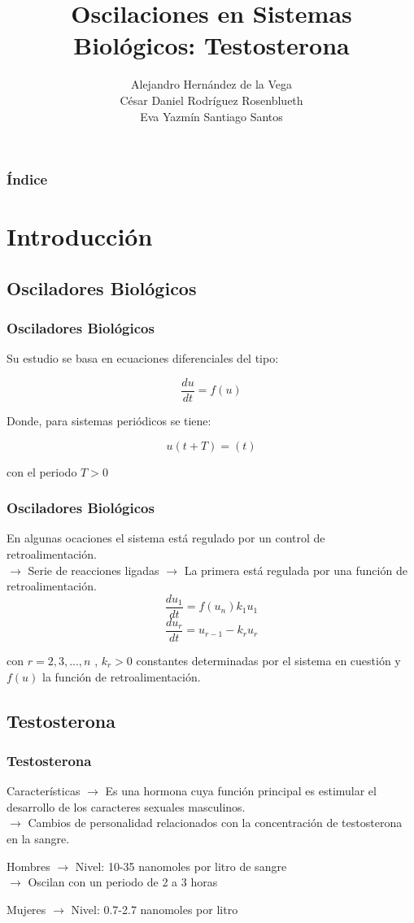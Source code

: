 \documentclass[10pt]{beamer}
\title[Oscilaciones en Sistemas Biológicos: Testosterona]{Oscilaciones en Sistemas Biológicos: Testosterona}
\author{Alejandro Hernández de la Vega\\ César Daniel Rodríguez Rosenblueth \\ Eva Yazmín Santiago Santos}
\institute{Facultad de Ciencias. UNAM}
\date{}
\begin{document}
\begin{frame}
\titlepage
\end{frame}

\begin{frame}
\frametitle{Índice}
\tableofcontents
\end{frame}

\section{Introducción}

\subsection{Osciladores Biológicos}

\begin{frame}
\frametitle{Osciladores Biológicos}
Su estudio se basa en ecuaciones diferenciales del tipo:

$$\dfrac{du}{dt} = f(u)$$

Donde, para sistemas periódicos se tiene:

$$u(t+T)= (t) $$

con el periodo $T>0$
\end{frame}

\begin{frame}
\frametitle{Osciladores Biológicos}
En algunas ocaciones el sistema está regulado por un control de retroalimentación. \\
$\rightarrow$  Serie de reacciones ligadas
$\rightarrow$ La primera está regulada por una función de retroalimentación.\\

$$ \dfrac{d u_1}{dt} = f(u_n )k_1 u_1 $$ 
$$ \dfrac{d u_r}{dt}= u_{r-1} -k_r u_r $$

con $r=2,3,...,n$ , $ k_r > 0 $ constantes determinadas por el sistema en cuestión y $ f(u)$ la función de retroalimentación.
\end{frame}


\subsection{Testosterona}
\begin{frame}
\frametitle{Testosterona}
\begin{block}{Características}
$\rightarrow$ Es una hormona cuya función principal es estimular el desarrollo de los caracteres sexuales masculinos.\\
$\rightarrow$ Cambios de personalidad relacionados con la concentración de testosterona en la sangre.
\end{block}
\begin{block}{Hombres}
$\rightarrow$ Nivel: 10-35 nanomoles por litro de sangre\\
$\rightarrow$ Oscilan con un periodo de 2 a 3 horas
\end{block}
\begin{block}{Mujeres}
$\rightarrow$ Nivel: 0.7-2.7 nanomoles por litro
\end{block}
\end{frame}
\end{document}
